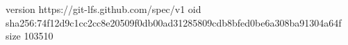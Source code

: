 version https://git-lfs.github.com/spec/v1
oid sha256:74f12d9c1cc2cc8e20509f0db00ad31285809cdb8bfed0be6a308ba91304a64f
size 103510
